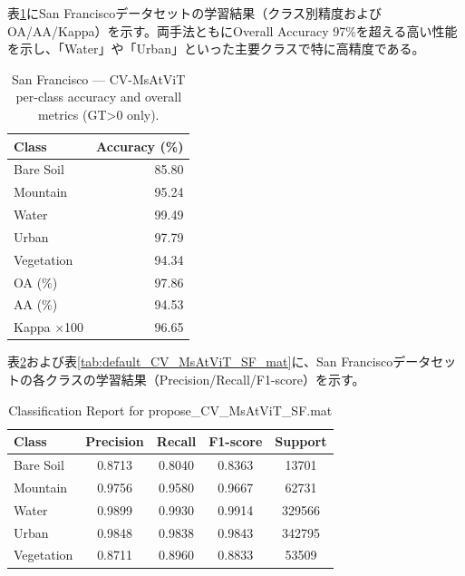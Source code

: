 表\ref{tab:sf_cvm}にSan Franciscoデータセットの学習結果（クラス別精度およびOA/AA/Kappa）を示す。両手法ともにOverall Accuracy 97\%を超える高い性能を示し、「Water」や「Urban」といった主要クラスで特に高精度である。

\begin{table}[H]
  \centering
  \caption{San Francisco — CV-MsAtViT per-class accuracy and overall metrics (GT>0 only).}
  \label{tab:sf_cvm}
  \begin{tabular}{l r}
    \toprule
    Class & Accuracy (\%) \\
    \midrule
    Bare Soil & 85.80 \\
    Mountain & 95.24 \\
    Water & 99.49 \\
    Urban & 97.79 \\
    Vegetation & 94.34 \\
    \midrule
    OA (\%) & 97.86 \\
    AA (\%) & 94.53 \\
    Kappa $\times$100 & 96.65 \\
    \bottomrule
  \end{tabular}
\end{table}

表\ref{tab:propose_CV_MsAtViT_SF_mat}および表\ref{tab:default_CV_MsAtViT_SF_mat}に、San Franciscoデータセットの各クラスの学習結果（Precision/Recall/F1-score）を示す。

\begin{table}[H]
    \centering
    \caption{Classification Report for propose\_CV\_MsAtViT\_SF.mat}
    \begin{tabular}{lcccc}
        \toprule
        Class & Precision & Recall & F1-score & Support \\
        \midrule
        Bare Soil & 0.8713 & 0.8040 & 0.8363 & 13701 \\
        Mountain & 0.9756 & 0.9580 & 0.9667 & 62731 \\
        Water & 0.9899 & 0.9930 & 0.9914 & 329566 \\
        Urban & 0.9848 & 0.9838 & 0.9843 & 342795 \\
        Vegetation & 0.8711 & 0.8960 & 0.8833 & 53509 \\
        \bottomrule
    \end{tabular}
    \label{tab:propose_CV_MsAtViT_SF_mat}
\end{table}

